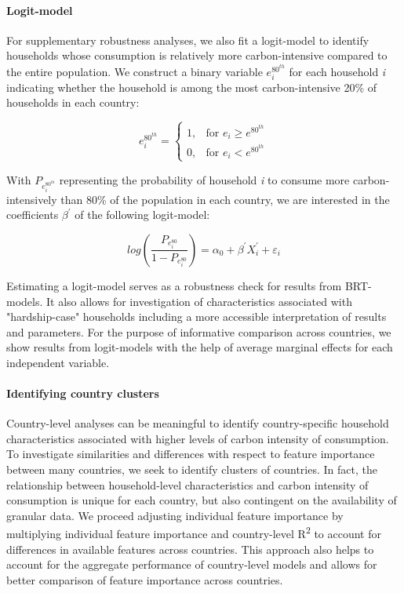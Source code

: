 \documentclass[12pt, a4paper]{article}
\begin{document}
\paragraph{Logit-model} For supplementary robustness analyses, we also fit a logit-model to identify households whose consumption is relatively more carbon-intensive compared to the entire population. We construct a binary variable $e_{i}^{80^{th}}$ for each household \textit{i} indicating whether the household is among the most carbon-intensive 20\% of households in each country:

\begin{equation}\label{eq:logit}
    e_{i}^{80^{th}} =
    \begin{cases}
    1, & \text{for }  e_{i} \geq e^{80^{th}} \\
    0, & \text{for }  e_{i} < e^{80^{th}}
    \end{cases}
\end{equation}

With $P_{e_{i}^{80^{th}}}$ representing the probability of household \textit{i} to consume more carbon-intensively than 80\% of the population in each country, we are interested in the coefficients $\beta^{'}$ of the following logit-model:

\begin{equation} \label{logit}
    log \left( \frac{P_{e_{i}^{80}}}{1 - P_{e_{i}^{80}}} \right) = \alpha_{0} + \beta^{'} X_{i}^{'} + \varepsilon_{i}
\end{equation}

Estimating a logit-model serves as a robustness check for results from BRT-models. It also allows for investigation of characteristics associated with "hardship-case" households including a more accessible interpretation of results and parameters. For the purpose of informative comparison across countries, we show results from logit-models with the help of average marginal effects for each independent variable.

\paragraph{Identifying country clusters} Country-level analyses can be meaningful to identify country-specific household characteristics associated with higher levels of carbon intensity of consumption. To investigate similarities and differences with respect to feature importance between many countries, we seek to identify clusters of countries. In fact, the relationship between household-level characteristics and carbon intensity of consumption is unique for each country, but also contingent on the availability of granular data. We proceed adjusting individual feature importance by multiplying individual feature importance and country-level R\textsuperscript{2} to account for differences in available features across countries. This approach also helps to account for the aggregate performance of country-level models and allows for better comparison of feature importance across countries.
\end{document}
